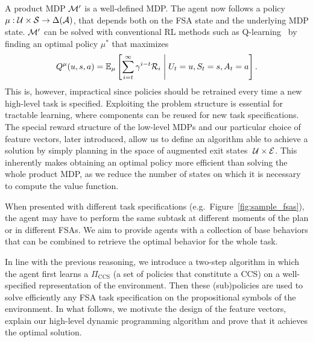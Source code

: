 A product MDP $\mathcal{M}'$ is a well-defined MDP. The agent now follows a policy $\mu:\mathcal{U}\times\mathcal{S}\rightarrow\Delta(\mathcal{A})$, that depends both on the FSA state and the underlying MDP state. $\mathcal{M}'$ can be solved with conventional RL methods such as Q-learning~\citep{Watkins1992} by finding an optimal policy $\mu^*$ that maximizes
\begin{equation*}
Q^\mu(u, s, a) = \mathbb{E}_{\mu}\left[\sum_{i=t}^\infty \gamma^{i-t}\mathcal{R}_i\;\middle\lvert\;U_t= u, S_t=s, A_t=a\right].
\end{equation*}
This is, however, impractical since policies should be retrained every time a new high-level task is specified. Exploiting the problem structure is essential for tractable learning, where components can be reused for new task specifications. The special reward structure of the low-level MDPs and our particular choice of feature vectors, later introduced, allow us to define an algorithm able to achieve a solution by simply planning in the space of augmented exit states $\;\mathcal{U}\times\mathcal{E}$. This inherently makes obtaining an optimal policy more efficient than solving the whole product MDP, as we reduce the number of states on which it is necessary to compute the value function.

 When presented with different task specifications (e.g.~Figure~\ref{fig:sample_fsas}), the agent may have to perform the same subtask at different moments of the plan or in different FSAs. We aim to provide agents with a collection of base behaviors that can be combined to retrieve the optimal behavior for the whole task.

In line with the previous reasoning, we introduce a two-step algorithm in which the agent first learns a $\Pi_{\text{CCS}}$ (a set of policies that constitute a CCS) on a well-specified representation of the environment. Then these (sub)policies are used to solve efficiently any FSA task specification on the propositional symbols of the environment. In what follows, we motivate the design of the feature vectors, explain our high-level dynamic programming algorithm and prove that it achieves the optimal solution.

